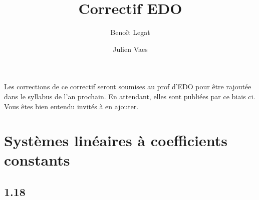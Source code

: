 \documentclass{article}
\title{Correctif EDO}
\author{Benoît Legat \and Julien Vaes}
\begin{document}
\maketitle

Les corrections de ce correctif seront soumises au prof d'EDO pour
être rajoutée dans le syllabus de l'an prochain.
En attendant, elles sont publiées par ce biais ci.
Vous êtes bien entendu invités à en ajouter.

\section{Systèmes linéaires à coefficients constants}

\subsection*{1.18}
\end{document}
